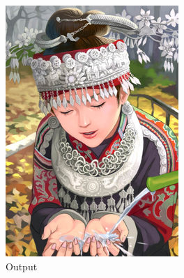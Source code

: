 \documentclass[12pt,a4paper]{article}
\begin{document}
\begin{figure}[H]
\begin{subfigure}{0.2\textwidth}
                \includegraphics[width=\textwidth]{images/samples/img-4-orig.png}
                \caption*{Output}
            \end{subfigure}
            \enspace
            \begin{subfigure}{0.2\textwidth}

\end{subfigure}
\end{figure}
\end{document}

